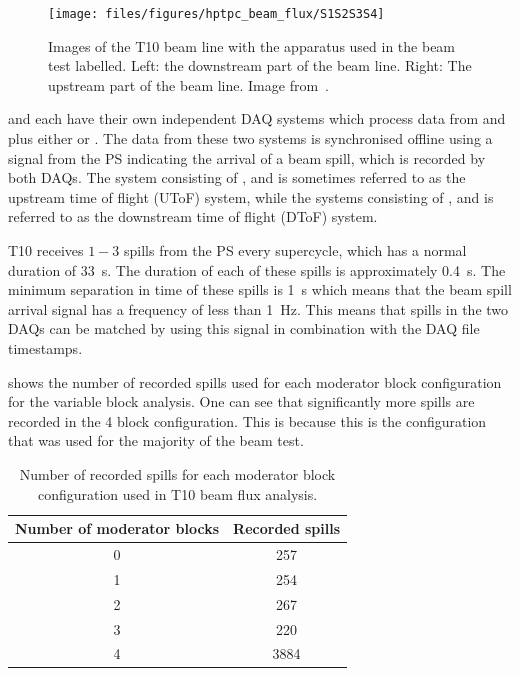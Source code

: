 \begin{figure}[h]
  \centering
  \texttt{[image: files/figures/hptpc\_beam\_flux/S1S2S3S4]}
  \caption[Images of the test beam setup with various objects labelled.]{Images of the T10 beam line with the apparatus used in the beam test labelled. Left: the downstream part of the beam line. Right: The upstream part of the beam line. Image from~\cite{beampaper}.}
  \label{fig:beamlinePics}
\end{figure}

\SThree and \SFour each have their own independent DAQ systems which process data from \SOne and \STwo plus either \SThree or \SFour.
The data from these two systems is synchronised offline using a signal from the PS indicating the arrival of a beam spill, which is recorded by both DAQs.
The system consisting of \SOne, \STwo and \SThree is sometimes referred to as the upstream time of flight (UToF) system, while the systems consisting of \SOne, \STwo and \SFour is referred to as the downstream time of flight (DToF) system.

T10 receives $1-3$ spills from the PS every supercycle, which has a normal duration of \SI{33}{\second}.
The duration of each of these spills is approximately \SI{0.4}{\second}.
The minimum separation in time of these spills is \SI{1}{\second} which means that the beam spill arrival signal has a frequency of less than \SI{1}{\hertz}.
This means that spills in the two DAQs can be matched by using this signal in combination with the DAQ file timestamps.

 shows the number of recorded spills used for each moderator block configuration for the variable block analysis.
One can see that significantly more spills are recorded in the 4 block configuration.
This is because this is the configuration that was used for the majority of the beam test.

\begin{table}
  \centering
  \caption[Number of recorded spills for each moderator block configuration used in T10 beam flux analysis.]{Number of recorded spills for each moderator block configuration used in T10 beam flux analysis.}
  \label{tab:nSpills}
  \begin{tabular}{c c}
    \hline
    \hline
    Number of moderator blocks & Recorded spills \\
    \hline
    0 & 257 \\
    1 & 254 \\
    2 & 267 \\
    3 & 220 \\
    4 & 3884 \\
    \hline
  \end{tabular}
\end{table}

